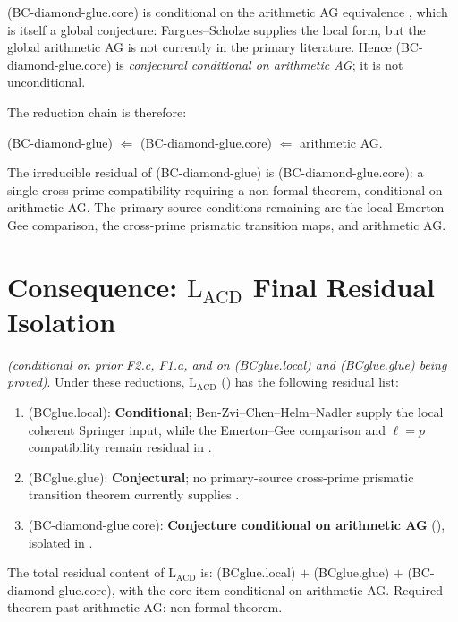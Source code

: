 \begin{remark}
\label{v4-arith:bcglue-k5:rem:core-vs-unconditional}
(BC-diamond-glue.core) is conditional on the arithmetic AG
equivalence , which is itself a
global conjecture: Fargues--Scholze supplies the local form,
but the global arithmetic AG is not currently in the primary
literature. Hence (BC-diamond-glue.core) is \emph{conjectural
conditional on arithmetic AG}; it is not unconditional.

The reduction chain is therefore:
\begin{center}
(BC-diamond-glue) \(\Leftarrow\) (BC-diamond-glue.core) \(\Leftarrow\)
arithmetic AG.
\end{center}
The irreducible residual of (BC-diamond-glue) is
(BC-diamond-glue.core): a single cross-prime compatibility requiring
a non-formal theorem, conditional on arithmetic AG. The primary-source
conditions remaining are the local Emerton--Gee comparison, the
cross-prime prismatic transition maps, and arithmetic AG.
\end{remark}

\section{Consequence: \(\mathrm{L}_{\mathrm{ACD}}\) Final Residual Isolation}
\label{v4-arith:bcglue-k5:LACD-final}

\begin{corollary}
\label{v4-arith:bcglue-k5:cor:LACD-tight-list}
\ClaimStatusConjectured \emph{(conditional on prior F2.c, F1.a,
and on (BCglue.local) and (BCglue.glue) being proved)}. Under these
reductions, \(\mathrm{L}_{\mathrm{ACD}}\)
()
has the following residual list:
\begin{enumerate}
\item (BCglue.local): \textbf{Conditional}; Ben-Zvi--Chen--Helm--Nadler supply the
local coherent Springer input, while the Emerton--Gee comparison and
\(\ell=p\) compatibility remain residual in
.
\item (BCglue.glue): \textbf{Conjectural}; no primary-source
cross-prime prismatic transition theorem currently supplies
.
\item (BC-diamond-glue.core): \textbf{Conjecture conditional on
arithmetic AG} (), isolated in
.
\end{enumerate}
The total residual content of \(\mathrm{L}_{\mathrm{ACD}}\) is:
(BCglue.local) \(+\) (BCglue.glue) \(+\) (BC-diamond-glue.core), with
the core item conditional on arithmetic AG. Required theorem past
arithmetic AG: non-formal theorem.
\end{corollary}

